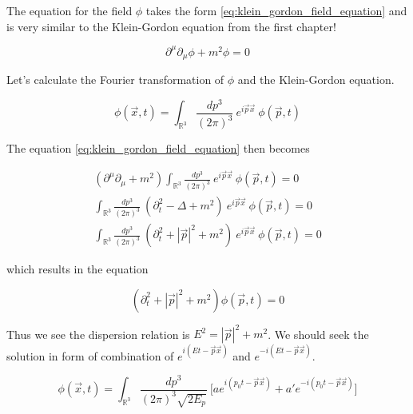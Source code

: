 The equation for the field $\phi$ takes the form \ref{eq:klein_gordon_field_equation} and is very similar to the Klein-Gordon
equation from the first chapter!

\begin{equation}
    \label{eq:klein_gordon_field_equation}
    \partial^{\mu} \partial_{\mu} \phi + m^2 \phi = 0
\end{equation}

Let's calculate the Fourier transformation of $\phi$ and the Klein-Gordon equation.

\begin{equation}
    \phi (\vec{x}, t) = \int_{\mathbb{R}^{3}} \frac{dp^{3}}{(2 \pi)^{3}} \ e^{i \vec{p} \vec{x}} \ \phi (\vec{p}, t)
\end{equation}

The equation \ref{eq:klein_gordon_field_equation} then becomes

\begin{equation*}
    \begin{gathered}
        (\partial^{\mu} \partial_{\mu} + m^2) \int_{\mathbb{R}^{3}} \frac{dp^{3}}{(2 \pi)^{3}} \ e^{i \vec{p} \vec{x}} \ \phi (\vec{p}, t) = 0 \\
        \int_{\mathbb{R}^{3}} \frac{dp^{3}}{(2 \pi)^{3}} \ (\partial_{t}^{2} - \Delta + m^2) \ e^{i \vec{p} \vec{x}} \ \phi (\vec{p}, t) = 0 \\
        \int_{\mathbb{R}^{3}} \frac{dp^{3}}{(2 \pi)^{3}} \ (\partial_{t}^{2} + | \vec{p} |^{2} + m^2) \ e^{i \vec{p} \vec{x}} \ \phi (\vec{p}, t) = 0
    \end{gathered}
\end{equation*}

which results in the equation

\begin{equation*}
    (\partial_{t}^{2} + | \vec{p} |^{2} + m^2) \phi (\vec{p}, t) = 0
\end{equation*}

Thus we see the dispersion relation is $E^{2} = | \vec{p} |^{2} + m^2$. We should seek the solution in form of combination of $e^{i (E t - \vec{p} \vec{x})}$
and $e^{- i (E t - \vec{p} \vec{x})}$.

\begin{equation*}
    \phi (\vec{x}, t) = \int_{\mathbb{R}^{3}} \frac{dp^{3}}{(2 \pi)^{3} \sqrt{2 E_{p}}} \ \bigg[a e^{i (p_{0} t - \vec{p} \vec{x})} + a' e^{- i (p_{0} t - \vec{p} \vec{x})}\bigg]
\end{equation*}

